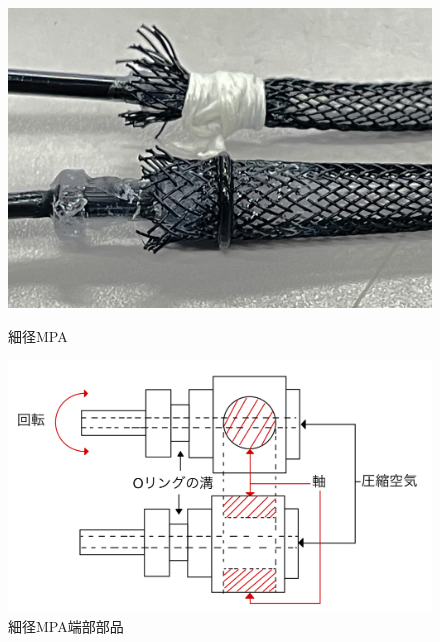 \documentclass{jarticle}
\begin{document}
\begin{figure}[H]
  \begin{minipage}[b]{0.47\columnwidth}
    \centering
    \includegraphics[scale=0.05]{mpa_oring_1.jpg}
    \vspace{-8mm}
    \caption{細径MPA}
    \label{fig:OringMPA}
  \end{minipage}
  \hspace{0.04\columnwidth}
  \begin{minipage}[b]{0.47\columnwidth}
    \centering
    \includegraphics[scale=0.05]{MPA_irast.jpg}
    \vspace{-5mm}
    \caption{細径MPA端部部品}
    \label{fig:MPAparts}
  \end{minipage}
\end{figure}
\end{document}
